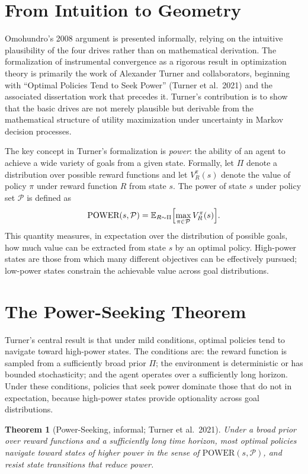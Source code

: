 \documentclass[12pt, oneside]{book}
\theoremstyle{plain}
\newtheorem{theorem}{Theorem}[chapter]
\theoremstyle{definition}
\theoremstyle{remark}
\theoremstyle{definition}
\begin{document}
\section{From Intuition to Geometry}

Omohundro's 2008 argument is presented informally, relying on the intuitive
plausibility of the four drives rather than on mathematical derivation. The
formalization of instrumental convergence as a rigorous result in optimization
theory is primarily the work of Alexander Turner and collaborators, beginning with
``Optimal Policies Tend to Seek Power'' (Turner et al.\ 2021) and the associated
dissertation work that precedes it. Turner's contribution is to show that the basic
drives are not merely plausible but derivable from the mathematical structure of
utility maximization under uncertainty in Markov decision processes.

The key concept in Turner's formalization is \emph{power}: the ability of an agent
to achieve a wide variety of goals from a given state. Formally, let $\Pi$ denote
a distribution over possible reward functions and let $V^\pi_R(s)$ denote the
value of policy $\pi$ under reward function $R$ from state $s$. The power of state
$s$ under policy set $\mathcal{P}$ is defined as
\[
\text{POWER}(s, \mathcal{P}) = \mathbb{E}_{R \sim \Pi}\Bigl[\max_{\pi \in \mathcal{P}} V^\pi_R(s)\Bigr].
\]
This quantity measures, in expectation over the distribution of possible goals, how
much value can be extracted from state $s$ by an optimal policy. High-power states
are those from which many different objectives can be effectively pursued; low-power
states constrain the achievable value across goal distributions.

\section{The Power-Seeking Theorem}

Turner's central result is that under mild conditions, optimal policies tend to
navigate toward high-power states. The conditions are: the reward function is
sampled from a sufficiently broad prior $\Pi$; the environment is deterministic or
has bounded stochasticity; and the agent operates over a sufficiently long horizon.
Under these conditions, policies that seek power dominate those that do not in
expectation, because high-power states provide optionality across goal distributions.

\begin{theorem}[Power-Seeking, informal; Turner et al.\ 2021]
\label{thm:turner}
Under a broad prior over reward functions and a sufficiently long time horizon,
most optimal policies navigate toward states of higher power in the sense of
$\mathrm{POWER}(s, \mathcal{P})$, and resist state transitions that reduce power.
\end{theorem}
\end{document}

